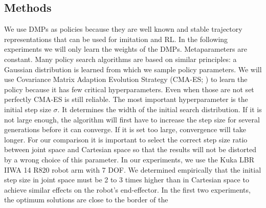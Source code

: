 \documentclass{svproc}
\begin{document}
\subsection{Methods}
We use DMPs as policies because they are well known and stable trajectory
representations that can be used for imitation and RL. In the following
experiments we will only learn the weights of the DMPs.
Metaparameters are constant.
Many policy search algorithms \cite{HeidrichMeisner2008,Kober2010,Neumann2011,Peters2010,Peters2007,Theodorou2010}
are based on similar principles:
a Gaussian distribution is learned from which we sample policy parameters.
We will use Covariance Matrix Adaption Evolution Strategy (CMA-ES;
\cite{Hansen2001}) to learn the policy
because it has few critical hyperparameters.
Even when those are not set perfectly CMA-ES is still reliable.
The most important hyperparameter is the initial step size $\sigma$.
It determines the width of the initial search distribution. If it is not large
enough, the algorithm will first have to increase the step size for
several generations before it can converge.
If it is set too large, convergence will take longer. For our comparison it
is important to select the correct step size ratio between joint space and
Cartesian space so that the results will not be distorted by a wrong choice of
this parameter.
In our experiments, we use the Kuka LBR IIWA 14 R820 robot arm with 7 DOF.
We determined empirically that the initial step size in joint space must be
2 to 3 times higher than in Cartesian space to achieve similar effects
on the robot's end-effector.
In the first two experiments, the optimum solutions are close to the border of the
\end{document}
